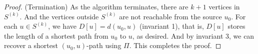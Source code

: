 \documentclass[thmcnt=section, 12pt, color=cyan]{my-elegantbook}
\begin{document}
\begin{proof}
    (Termination) As the algorithm terminates, there are $k+1$ vertices in $S^{(k)}$. And the vertices outside $S^{(k)}$ are not reachable from the source $u_0$. For each $u \in S^{(k)}$, we have $D[u] = d(u_0, u)$ (invariant 1), that is, $D[u]$ stores the length of a shortest path from $u_0$ to $u$, as desired. And by invariant 3, we can recover a shortest $(u_0, u)$-path using $\Pi$. This completes the proof.
\end{proof}



\printbibliography[heading=bibintoc, title=References]


\printindex

\end{document}
